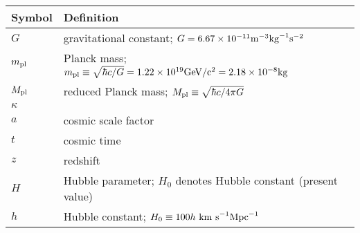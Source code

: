 
\begin{tabular}{ll}
\hline\hline
Symbol & Definition \\
\hline
$G$ & gravitational constant; $G=6.67\times10^{-11}\rm{m}^{-3}\rm{kg}^{-1}\rm{s}^{-2}$ \\
$m_{\text{\scriptsize pl}}$ & Planck mass; $m_{\text{\scriptsize pl}}\equiv\sqrt{\hbar c/G}=1.22\times10^{19}\rm{GeV}/c^2=2.18\times10^{-8}\rm{kg}$\\
$M_{\text{\scriptsize pl}}$ & reduced Planck mass; $M_{\text{\scriptsize pl}}\equiv\sqrt{\hbar c/4\pi G}$\\
$\kappa$ & \\
$a$ & cosmic scale factor \\
$t$ & cosmic time \\
$z$ & redshift \\
$H$ & Hubble parameter; $H_0$ denotes Hubble constant (present value) \\
$h$ & Hubble constant; $H_0\equiv100 h \rm{\ km\ s}^{-1}\rm{Mpc}^{-1}$ \\
\hline\hline
\end{tabular}